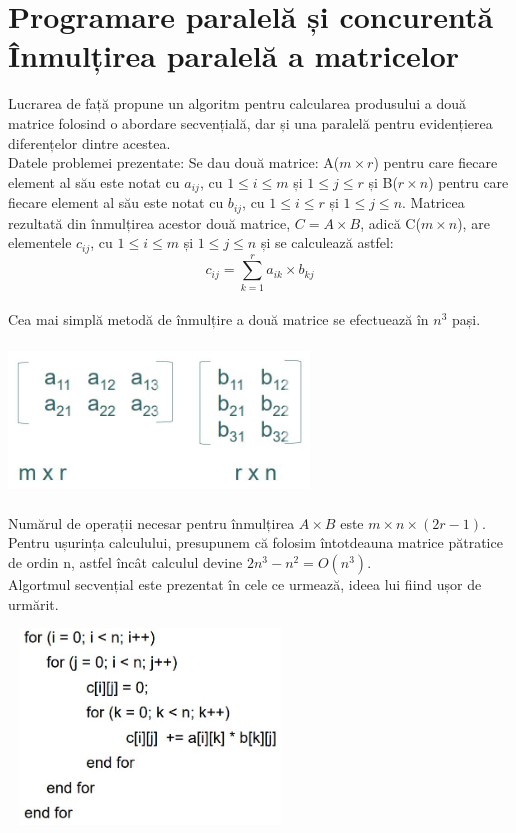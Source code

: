 \documentclass[a4paper,12pt]{report}
\newcommand\tab[1][1cm]{\hspace*{#1}}
\begin{document}
\chapter* {Programare paralelă și concurentă\\Înmulțirea paralelă a matricelor\\}

\tab Lucrarea de față propune un algoritm pentru calcularea produsului a două matrice folosind o abordare secvențială, dar și una paralelă pentru evidențierea diferențelor dintre acestea.
\\ 
\tab Datele problemei prezentate: Se dau două matrice: A($m\times r$) pentru care fiecare element al său este notat cu $a_{ij}$, cu $1\leq i\leq m$ și $1\leq j \leq r$ și B($r\times n$) pentru care fiecare element al său este notat cu $b_{ij}$, cu $1\leq i\leq r$ și $1\leq j \leq n$. Matricea rezultată din înmulțirea acestor două matrice, $C=A\times B$, adică C($m\times n$), are elementele $c_{ij}$, cu $1\leq i\leq m$ și $1\leq j \leq n$ și se calculează astfel: $$c_{ij}=\sum_{k=1}^{r} a_{ik} \times b_{kj}$$
\\
\tab Cea mai simplă metodă de înmulțire a două matrice se efectuează în $n^3$ pași.
\begin{center}
	\includegraphics[width=8cm, height=4cm]{1.jpg}
\end{center}
\tab Numărul de operații necesar pentru înmulțirea $A\times B$ este $m\times n\times (2r-1)$. Pentru ușurința calculului, presupunem că folosim întotdeauna matrice pătratice de ordin n, astfel încât calculul devine $2n^3-n^2=O(n^3)$.
\\
\tab Algortmul secvențial este prezentat în cele ce urmează, ideea lui fiind ușor de urmărit. 
\begin{center}
	\includegraphics[width=7.5cm, height=5.2cm]{2.jpg}
\end{center}
\end{document}
